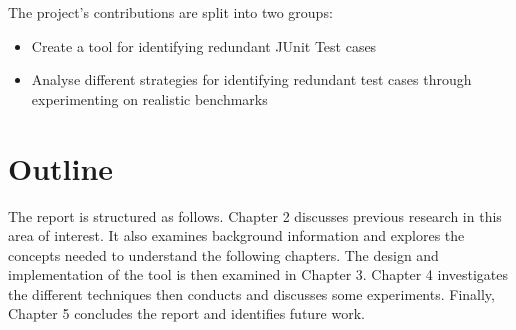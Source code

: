 The project's contributions are split into two groups: 

\begin{itemize}
\item Create a tool for identifying redundant JUnit Test cases
\item Analyse different strategies for identifying redundant test cases through experimenting on realistic benchmarks
\end{itemize}

\section{Outline}

The report is structured as follows. Chapter 2 discusses previous research in this area of interest. It also examines background information and explores the concepts needed to understand the following chapters. The design and implementation of the tool is then examined in Chapter 3. Chapter 4 investigates the different techniques then conducts and discusses some experiments. Finally, Chapter 5 concludes the report and identifies future work.